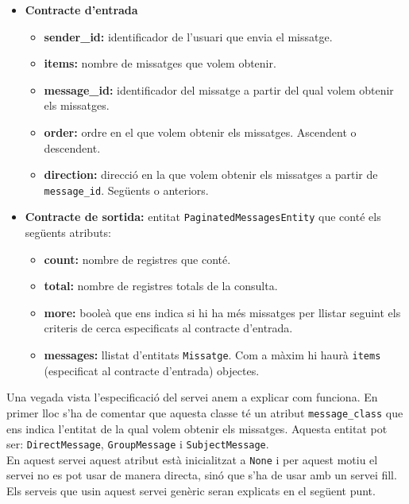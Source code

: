 \begin{itemize}
			\begin{itemize}
					\item \textbf{Contracte d'entrada}
						\begin{itemize}
							\item \textbf{sender\_id:} identificador de l'usuari que envia el missatge.
							\item \textbf{items:} nombre de missatges que volem obtenir.
							\item \textbf{message\_id:} identificador del missatge a partir del qual volem obtenir els missatges.
							\item \textbf{order:} ordre en el que volem obtenir els missatges. Ascendent o descendent.
							\item \textbf{direction:} direcció en la que volem obtenir els missatges a partir de \texttt{message\_id}. Següents o anteriors.
						\end{itemize}
					\item \textbf{Contracte de sortida:} entitat \texttt{PaginatedMessagesEntity} que conté els següents atributs:
					\begin{itemize}
						\item \textbf{count:} nombre de registres que conté.
						\item \textbf{total:} nombre de registres totals de la consulta.
						\item \textbf{more:} booleà que ens indica si hi ha més missatges per llistar seguint els criteris de cerca especificats al contracte d'entrada.
						\item \textbf{messages:} llistat d'entitats \texttt{Missatge}. Com a màxim hi haurà \texttt{items} (especificat al contracte d'entrada) objectes.
					\end{itemize}
			\end{itemize}
			
			Una vegada vista l'especificació del servei anem a explicar com funciona. En primer lloc s'ha de comentar que aquesta classe té un atribut \texttt{message\_class} que ens indica l'entitat de la qual volem obtenir els missatges. Aquesta entitat pot ser: \texttt{DirectMessage}, \texttt{GroupMessage} i \texttt{SubjectMessage}.\\
			
			En aquest servei aquest atribut està inicialitzat a \texttt{None} i per aquest motiu el servei no es pot usar de manera directa, sinó que s'ha de usar amb un servei fill. Els serveis que usin aquest servei genèric seran explicats en el següent punt.\\
			

\end{itemize}
